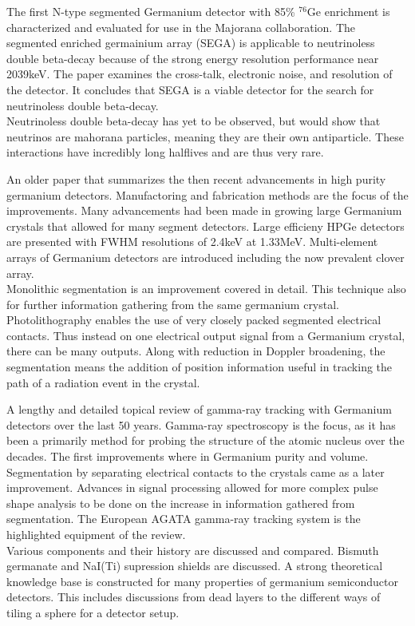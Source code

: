 \documentclass[12pt]{article}
\begin{document}
{\large\textbf{\cite{Leviner201466}}}

The first N-type segmented Germanium detector with 85\% $^{76}\mbox{Ge}$ enrichment is characterized and evaluated for use in the Majorana collaboration. The segmented enriched germainium array (SEGA) is applicable to neutrinoless double beta-decay because of the strong energy resolution performance near 2039keV. The paper examines the cross-talk, electronic noise, and resolution of the detector. It concludes that SEGA is a viable detector for the search for neutrinoless double beta-decay.
\\
Neutrinoless double beta-decay has yet to be observed, but would show that neutrinos are mahorana particles, meaning they are their own antiparticle. These interactions have incredibly long halflives and are thus very rare.
\\[20pt]


{\large\textbf{\cite{Sangsingkeow2003183}}}

An older paper that summarizes the then recent advancements in high purity germanium detectors. Manufactoring and fabrication methods are the focus of the improvements. Many advancements had been made in growing large Germanium crystals that allowed for many segment detectors. Large efficieny HPGe detectors are presented with FWHM resolutions of 2.4keV at 1.33MeV. Multi-element arrays of Germanium detectors are introduced including the now prevalent clover array.
\\
Monolithic segmentation is an improvement covered in detail. This technique also for further information gathering from the same germanium crystal. Photolithography enables the use of very closely packed segmented electrical contacts. Thus instead on one electrical output signal from a Germanium crystal, there can be many outputs. Along with reduction in Doppler broadening, the segmentation means the addition of position information useful in tracking the path of a radiation event in the crystal.
\\[20pt]


{\large\textbf{\cite{Eberth2008283}}}

A lengthy and detailed topical review of gamma-ray tracking with Germanium detectors over the last 50 years. Gamma-ray spectroscopy is the focus, as it has been a primarily method for probing the structure of the atomic nucleus over the decades. The first improvements where in Germanium purity and volume. Segmentation by separating electrical contacts to the crystals came as a later improvement. Advances in signal processing allowed for more complex pulse shape analysis to be done on the increase in information gathered from segmentation. The European AGATA gamma-ray tracking system is the highlighted equipment of the review.
\\
Various components and their history are discussed and compared. Bismuth germanate and NaI(Ti) supression shields are discussed. A strong theoretical knowledge base is constructed for many properties of germanium semiconductor detectors. This includes discussions from dead layers to the different ways of tiling a sphere for a detector setup.
\\[20pt]
\end{document}
